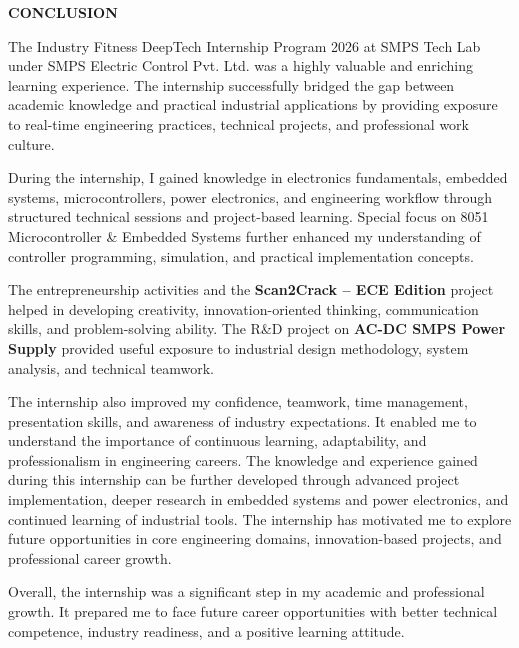\documentclass[10pt]{article}
\begin{document}
\begin{center}
{\fontsize{18pt}{18pt}\selectfont \textbf{CONCLUSION}}
\end{center}

\onehalfspacing
\fontsize{12pt}{14pt}\selectfont
\setlength{\parskip}{6pt}

\noindent
The Industry Fitness DeepTech Internship Program 2026 at SMPS Tech Lab under SMPS Electric Control Pvt. Ltd. was a highly valuable and enriching learning experience. The internship successfully bridged the gap between academic knowledge and practical industrial applications by providing exposure to real-time engineering practices, technical projects, and professional work culture.

\noindent
During the internship, I gained knowledge in electronics fundamentals, embedded systems, microcontrollers, power electronics, and engineering workflow through structured technical sessions and project-based learning. Special focus on 8051 Microcontroller \& Embedded Systems further enhanced my understanding of controller programming, simulation, and practical implementation concepts.

\noindent
The entrepreneurship activities and the \textbf{Scan2Crack -- ECE Edition} project helped in developing creativity, innovation-oriented thinking, communication skills, and problem-solving ability. The R\&D project on \textbf{AC-DC SMPS Power Supply} provided useful exposure to industrial design methodology, system analysis, and technical teamwork.

\noindent
The internship also improved my confidence, teamwork, time management, presentation skills, and awareness of industry expectations. It enabled me to understand the importance of continuous learning, adaptability, and professionalism in engineering careers.
\noindent
The knowledge and experience gained during this internship can be further developed through advanced project implementation, deeper research in embedded systems and power electronics, and continued learning of industrial tools. The internship has motivated me to explore future opportunities in core engineering domains, innovation-based projects, and professional career growth.

\noindent
Overall, the internship was a significant step in my academic and professional growth. It prepared me to face future career opportunities with better technical competence, industry readiness, and a positive learning attitude.\\
\end{document}

